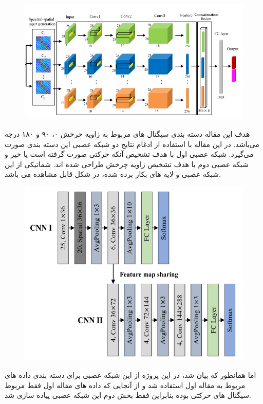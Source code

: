 \begin{figure}
\centering
\includegraphics[width=15cm]{img/cnn2.png}
\end{figure}

هدف این مقاله دسته بندی سیگنال های مربوط به زاویه چرخش ۰، ۹۰ و ۱۸۰ درجه می‌باشد. در این مقاله با استفاده از ادغام نتایج دو شبکه عصبی این دسته بندی صورت می‌گیرد. شبکه عصبی اول با هدف تشخیص آنکه حرکتی صورت گرفته است یا خیر و شبکه عصبی دوم با هدف تشخیص زاویه چرخش طراحی شده اند. شماتیکی از این شبکه عصبی و لایه های بکار برده شده، در شکل  قابل مشاهده می باشد.

\begin{figure}
\centering
\includegraphics[width=12cm]{img/cnn3.png}
\end{figure}

اما همانطور که بیان شد، در این پروژه از این شبکه عصبی برای دسته بندی داده های مربوط به مقاله اول استفاده شد و از آنجایی که داده های مقاله اول فقط مربوط سیگنال های حرکتی بوده بنابراین فقط بخش دوم این شبکه عصبی پیاده سازی شد.
